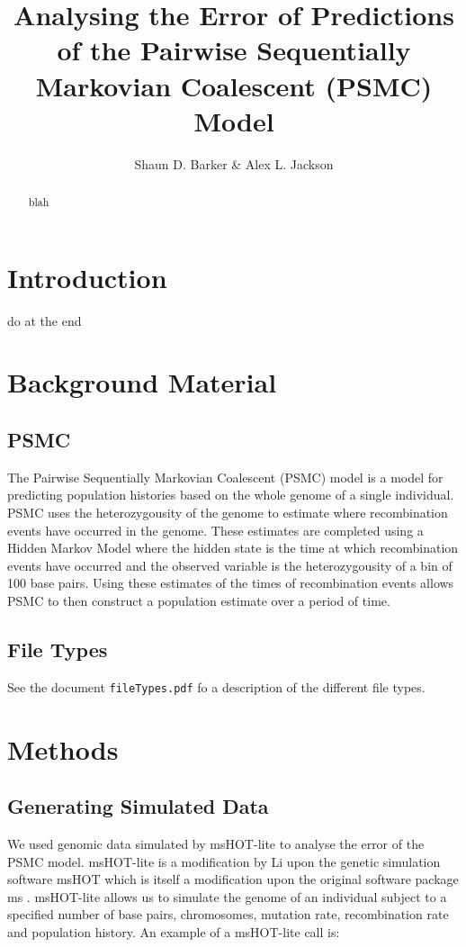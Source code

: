 \documentclass[11pt,a4paper]{article}
\title{Analysing the Error of Predictions of the Pairwise Sequentially Markovian Coalescent (PSMC) Model}
\author{Shaun D. Barker & Alex L. Jackson}
\begin{document}
\maketitle

\begin{abstract}
blah

\end{abstract}
\section{Introduction}
do at the end

\section{Background Material}
\subsection{PSMC}
The Pairwise Sequentially Markovian Coalescent (PSMC) model \cite{li2011inference} is a model for predicting population histories based on the whole genome of a single individual. PSMC uses the heterozygousity of the genome to estimate where recombination events have occurred in the genome. These estimates are completed using a Hidden Markov Model where the hidden state is the time at which recombination events have occurred and the observed variable is the heterozygousity of a bin of 100 base pairs. Using these estimates of the times of recombination events allows PSMC to then construct a population estimate over a period of time. 

\subsection{File Types}
See the document \verb|fileTypes.pdf| fo a description of the different file types.


\section{Methods}\label{sec:methods}
\subsection{Generating Simulated Data} %
We used genomic data simulated by msHOT-lite \cite{mshotlite} to analyse the error of the PSMC model. msHOT-lite is a modification by Li upon the genetic simulation software msHOT \cite{hellenthal2007mshot} which is itself a modification upon the original software package ms \cite{hudson2002generating}. msHOT-lite allows us to simulate the genome of an individual subject to a specified number of base pairs, chromosomes, mutation rate, recombination rate and population history. 
An example of a msHOT-lite call is: 
\end{document}
